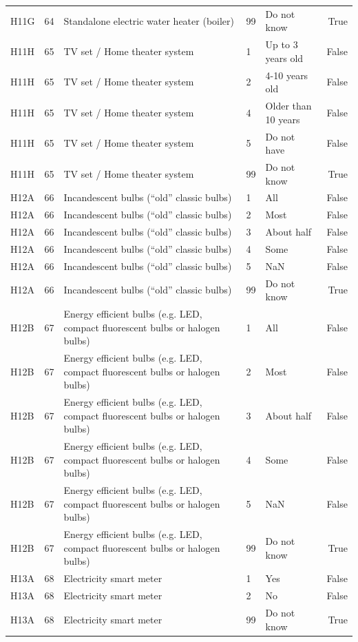 \begin{tabular}{lrlllr}
H11G & 64 & Standalone electric water heater (boiler) & 99 & Do not know & True \\
H11H & 65 & TV set / Home theater system & 1 & Up to 3 years old & False \\
H11H & 65 & TV set / Home theater system & 2 & 4-10 years old & False \\
H11H & 65 & TV set / Home theater system & 4 & Older than 10 years & False \\
H11H & 65 & TV set / Home theater system & 5 & Do not have & False \\
H11H & 65 & TV set / Home theater system & 99 & Do not know & True \\
H12A & 66 & Incandescent bulbs (“old” classic bulbs) & 1 & All & False \\
H12A & 66 & Incandescent bulbs (“old” classic bulbs) & 2 & Most & False \\
H12A & 66 & Incandescent bulbs (“old” classic bulbs) & 3 & About half & False \\
H12A & 66 & Incandescent bulbs (“old” classic bulbs) & 4 & Some & False \\
H12A & 66 & Incandescent bulbs (“old” classic bulbs) & 5 & NaN & False \\
H12A & 66 & Incandescent bulbs (“old” classic bulbs) & 99 & Do not know & True \\
H12B & 67 & Energy efficient bulbs (e.g. LED, compact fluorescent bulbs or halogen bulbs) & 1 & All & False \\
H12B & 67 & Energy efficient bulbs (e.g. LED, compact fluorescent bulbs or halogen bulbs) & 2 & Most & False \\
H12B & 67 & Energy efficient bulbs (e.g. LED, compact fluorescent bulbs or halogen bulbs) & 3 & About half & False \\
H12B & 67 & Energy efficient bulbs (e.g. LED, compact fluorescent bulbs or halogen bulbs) & 4 & Some & False \\
H12B & 67 & Energy efficient bulbs (e.g. LED, compact fluorescent bulbs or halogen bulbs) & 5 & NaN & False \\
H12B & 67 & Energy efficient bulbs (e.g. LED, compact fluorescent bulbs or halogen bulbs) & 99 & Do not know & True \\
H13A & 68 & Electricity smart meter & 1 & Yes & False \\
H13A & 68 & Electricity smart meter & 2 & No & False \\
H13A & 68 & Electricity smart meter & 99 & Do not know & True \\

\end{tabular}
